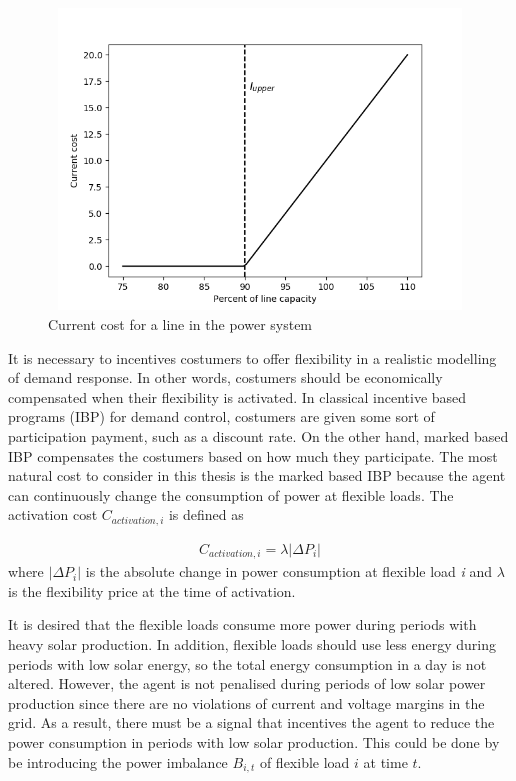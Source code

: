 \documentclass[class=book, crop=false]{standalone}
\begin{document}
\begin{figure}[ht]
    \center
\includegraphics[height=8cm, width=12cm]{figures/current_cost.png}
    \caption[size = 9]{Current cost for a line in the power system}
    \label{fig:problem:current_cost}
\end{figure}

It is necessary to incentives costumers to offer flexibility in a realistic modelling of demand response. In other words, costumers should be economically compensated when their flexibility is activated. In classical incentive based programs (IBP) for demand control, costumers are given some sort of participation payment, such as a discount rate\cite{demand_response_definition}. On the other hand, marked based IBP compensates the costumers based on how much they participate. The most natural cost to consider in this thesis is the marked based IBP because the agent can continuously change the consumption of power at flexible loads. The activation cost $C_{activation,i}$ is defined as

\begin{equation}
   \begin{aligned}
   \label{eq:problem:activation_cost}
    C_{activation,i} = \lambda |\Delta P_{i}|
    \end{aligned} 
\end{equation}
where $|\Delta P_{i}|$  is the absolute change in power consumption at flexible load \textit{i} and $\lambda$ is the flexibility price at the time of activation.

It is desired that the flexible loads consume more power during periods with heavy solar production. In addition, flexible loads should use less energy during periods with low solar energy, so the total energy consumption in a day is not altered. However, the agent is not penalised during periods of low solar power production since there are no violations of current and voltage margins in the grid. As a result, there must be a signal that incentives the agent to reduce the power consumption in periods with low solar production. This could be done by be introducing the power imbalance $B_{i,t}$ of flexible load $i$ at time $t$.
\end{document}
